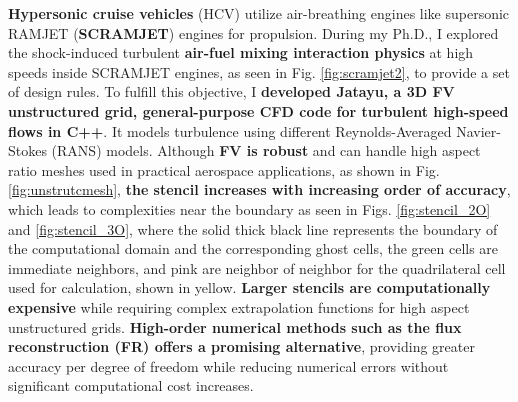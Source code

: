 \documentclass[11pt,sans]{wlscirep} %
\begin{document}
\noindent  \textbf{Hypersonic cruise vehicles} (HCV) utilize air-breathing engines like supersonic RAMJET (\textbf{SCRAMJET}) engines for propulsion. During my Ph.D., I explored the shock-induced turbulent \textbf{air-fuel mixing interaction physics} at high speeds inside SCRAMJET engines, as seen in Fig. \ref{fig:scramjet2}, to provide a set of design rules\cite{sharma2020computational, sharma2020determination,sharma2020effect, sharma2020effect2, sharma2022influence}.
\noindent To fulfill this objective, I \textbf{developed Jatayu, a 3D FV unstructured grid, general-purpose CFD code for turbulent high-speed flows in C++}. It models turbulence using different Reynolds-Averaged Navier-Stokes (RANS) models\cite{sharma2022development}. Although \textbf{FV is robust} and can handle high aspect ratio meshes used in practical aerospace applications, as shown in Fig. \ref{fig:unstrutcmesh}, \textbf{the stencil increases with increasing order of accuracy}, which leads to complexities near the boundary as seen in Figs. \ref{fig:stencil_2O} and \ref{fig:stencil_3O}, where the solid thick black line represents the boundary of the computational domain and the corresponding ghost cells, the green cells are immediate neighbors, and pink are neighbor of neighbor for the quadrilateral cell used for calculation, shown in yellow. \textbf{Larger stencils are computationally expensive} while requiring complex extrapolation functions for high aspect unstructured grids. \textbf{High-order numerical methods such as the flux reconstruction (FR)\cite{huynh2007flux} offers a promising alternative}, providing greater accuracy per degree of freedom while reducing numerical errors without significant computational cost increases. 
\end{document}
